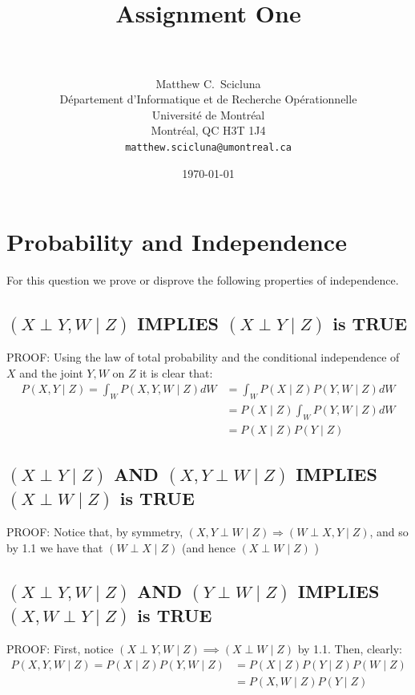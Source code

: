 \documentclass[paper=a4, fontsize=11pt]{scrartcl} %
\title{	
\normalfont \normalsize 
\horrule{0.5pt} \\[0.4cm] %
\huge Assignment One \\ %
\horrule{2pt} \\[0.5cm] %
}
\author{
	Matthew C.~Scicluna\\
	D\'epartement d'Informatique et de Recherche Op\'erationnelle\\
	Universit\'e de Montr\'eal\\
	Montr\'eal, QC H3T 1J4 \\
	\texttt{matthew.scicluna@umontreal.ca}
}
\date{\normalsize\today} %
\numberwithin{equation}{section} %
\numberwithin{figure}{section} %
\numberwithin{table}{section} %
\begin{document}
\maketitle %

\section{Probability and Independence}
For this question we prove or disprove the following properties of independence.

\subsection{$(X \perp Y, W \mid Z)$ IMPLIES $(X \perp Y \mid Z)$ is TRUE}
	PROOF: Using the law of total probability and the conditional independence of $X$ and the joint $Y, W$ on $Z$ it is clear that:
	\begin{align*} P(X, Y \mid Z) = \int_W P(X, Y, W \mid Z) dW &= \int_W P(X \mid Z)P(Y, W \mid Z) dW \\
	&= P(X \mid Z) \int_W P(Y, W \mid Z) dW \\
	&= P(X \mid Z)P(Y \mid Z)
	\end{align*}

\subsection{$(X \perp Y \mid Z)$ AND $(X, Y \perp W \mid Z)$ IMPLIES $(X \perp W \mid Z)$ is TRUE}
PROOF: Notice that, by symmetry, $(X, Y \perp W \mid Z) \Rightarrow (W \perp X, Y \mid Z)$, and so by 1.1 we have that 
$(W \perp X \mid Z)$ (and hence $(X \perp W \mid Z)$ )

\subsection{$(X \perp Y, W \mid Z)$ AND $(Y \perp W \mid Z)$ IMPLIES $(X, W \perp Y \mid Z)$ is TRUE}
PROOF: First, notice $(X \perp Y, W \mid Z) \implies (X \perp W \mid Z)$ by 1.1. Then, clearly:
\begin{align*} P(X, Y, W \mid Z) = P(X \mid Z)P(Y, W \mid Z) &= P(X \mid Z)P(Y \mid Z)P(W \mid Z) \\
&=  P(X, W \mid Z)P(Y \mid Z)
\end{align*}
\end{document}
